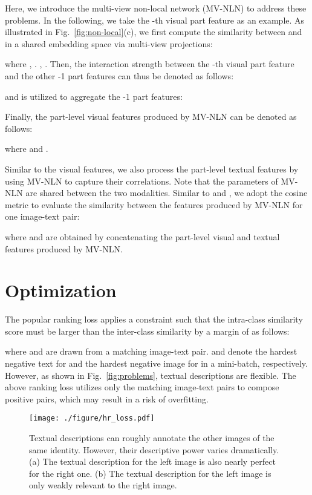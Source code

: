 \documentclass[journal]{IEEEtran}
\begin{document}
Here, we introduce the multi-view non-local network (MV-NLN) to address these problems. In the following, we take the -th visual part feature as an example. As illustrated in Fig.~\ref{fig:non-local}(c), we first compute the similarity between  and  in a shared embedding space via multi-view projections:

where , . , . Then, the interaction strength between the -th visual part feature and the other -1 part features can thus be denoted as follows:


and  is utilized to aggregate the -1 part features:



Finally, the part-level visual features produced by MV-NLN can be denoted as follows:

where  and .

Similar to the visual features, we also process the part-level textual features by using MV-NLN to capture their correlations. Note that the  parameters of MV-NLN are shared between the two modalities. Similar to  and , we adopt the cosine metric to evaluate the similarity between the features produced by MV-NLN for one image-text pair:

where  and  are obtained by concatenating the  part-level visual and textual features produced by MV-NLN.


\section{Optimization} \label{Optimization}
The popular ranking loss \cite{faghri2017vse++} applies a constraint such that the intra-class similarity score must be larger than the inter-class similarity by a margin of  as follows:

where  and  are drawn from a matching image-text pair.  and  denote the hardest negative text for  and the hardest negative image for   in a mini-batch, respectively. However, as shown in Fig.~\ref{fig:problems}, textual descriptions are flexible. The above ranking loss utilizes only the matching image-text pairs to compose positive pairs, which may result in a risk of overfitting.

\begin{figure}[t]
\begin{center}
\texttt{[image: ./figure/hr\_loss.pdf]}
\end{center}
   \caption{Textual descriptions can roughly annotate the other images of the same identity. However, their descriptive power varies dramatically.  (a) The textual description for the left image is also nearly perfect for the right one. (b) The textual description for the left image is only weakly relevant to the right image. }
\label{fig:hr_loss}
\end{figure}
\end{document}
